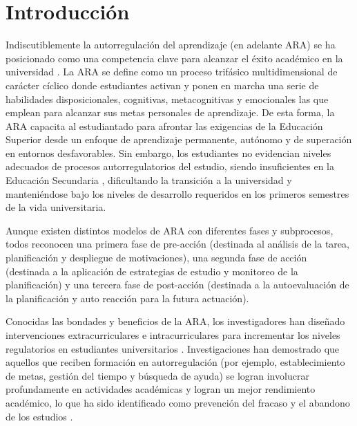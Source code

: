 \documentclass[spanish]{textolivre}
\begin{document}
\begin{polyabstract}
\begin{english}
\begin{abstract}
\end{abstract}
\end{english}

\end{polyabstract}

\section{Introducción}

Indiscutiblemente la autorregulación del aprendizaje (en adelante ARA) se ha posicionado como una competencia clave para alcanzar el éxito académico en la universidad \cite{lobos2021design}. La ARA se define como un proceso trifásico multidimensional de carácter cíclico donde estudiantes activan y ponen en marcha una serie de habilidades disposicionales, cognitivas, metacognitivas y emocionales las que emplean para alcanzar sus metas personales de aprendizaje. De esta forma, la ARA capacita al estudiantado para afrontar las exigencias de la Educación Superior desde un enfoque de aprendizaje permanente, autónomo y de superación en entornos desfavorables. Sin embargo, los estudiantes no evidencian niveles adecuados de procesos autorregulatorios del estudio, siendo insuficientes en la Educación Secundaria \cite{saez2021association}, dificultando la transición a la universidad y manteniéndose bajo los niveles de desarrollo requeridos en los primeros semestres de la vida universitaria. 

Aunque existen distintos modelos de ARA con diferentes fases y subprocesos, todos reconocen una primera fase de pre-acción (destinada al análisis de la tarea, planificación y despliegue de motivaciones), una segunda fase de acción (destinada a la aplicación de estrategias de estudio y monitoreo de la planificación) y una tercera fase de post-acción (destinada a la autoevaluación de la planificación y auto reacción para la futura actuación). 

Conocidas las bondades y beneficios de la ARA, los investigadores han diseñado intervenciones extracurriculares e intracurriculares para incrementar los niveles regulatorios en estudiantes universitarios \cite{saez2020impacto}. Investigaciones han demostrado que aquellos que reciben formación en autorregulación (por ejemplo, establecimiento de metas, gestión del tiempo y búsqueda de ayuda) se logran involucrar profundamente en actividades académicas y logran un mejor rendimiento académico, lo que ha sido identificado como prevención del fracaso y el abandono de los estudios \cite{bernardo2017meta}.
\end{document}
